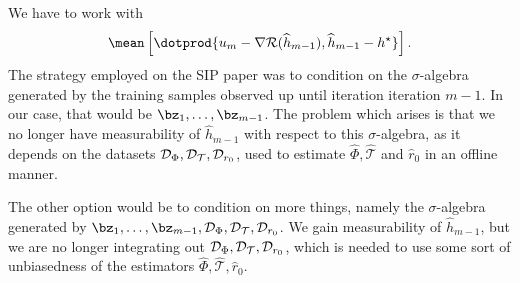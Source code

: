 \begin{description}[style=unboxed, leftmargin=0cm]
    \item[Third term]
        We have to work with
        \begin{equation*}
            \mean \left[
                \dotprod{ u_{ m } - \nabla \risk ( \hat{ h }_{ m-1 } ), \hat{ h }_{ m-1 } - \hstar }
            \right]
        .\end{equation*}
        The strategy employed on the SIP paper was to condition on the $ \sigma $-algebra generated by the training samples observed up until iteration iteration $ m - 1 $.
        In our case, that would be $ \bz_{ 1 }, \dots, \bz_{ m-1 } $.
        The problem which arises is that we no longer have measurability of $ \hat{ h }_{ m-1 } $ with respect to this $ \sigma $-algebra, as it depends on the datasets $ \mathcal{D}_{ \Phi }, \mathcal{D}_{ \mathcal{T} }, \mathcal{D}_{ r_{ 0 } } $, used to estimate $ \hat{ \Phi }, \hat{ \mathcal{T} } $ and $ \hat{ r }_{ 0 } $ in an offline manner.

        The other option would be to condition on more things, namely the $ \sigma $-algebra generated by $ \bz_{ 1 }, \dots, \bz_{ m - 1 }, \data_{ \Phi }, \data_{ \mathcal{T} }, \data_{ r_{ 0 } } $.
        We gain measurability of $ \hat{ h }_{ m-1 } $, but we are no longer integrating out $ \mathcal{D}_{ \Phi }, \mathcal{D}_{ \mathcal{T} }, \mathcal{D}_{ r_{ 0 } } $, which is needed to use some sort of unbiasedness of the estimators $ \hat{ \Phi }, \hat{ \mathcal{T} }, \hat{ r }_{ 0 } $.


\end{description}
